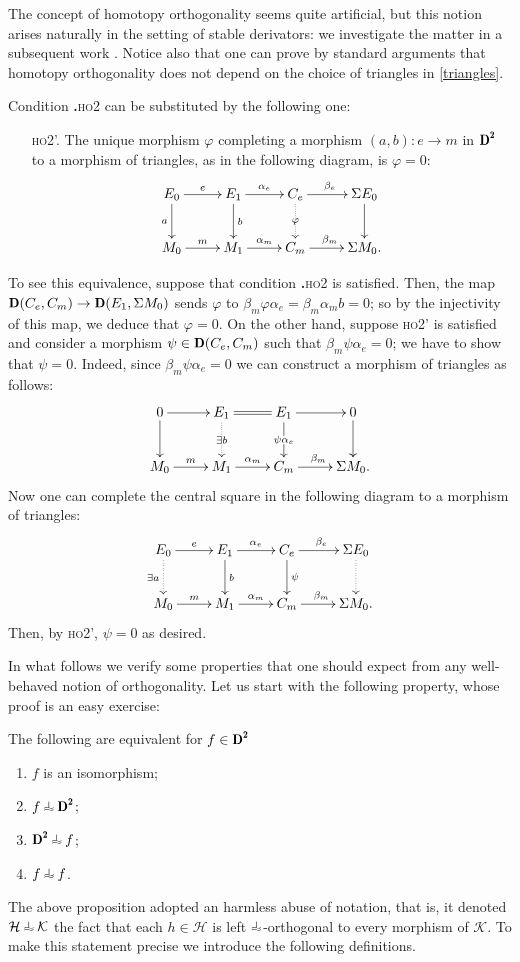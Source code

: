 The concept of homotopy orthogonality seems quite artificial, but this notion arises naturally in the setting of stable derivators: we investigate the matter in a subsequent work \cite{new_fs_on_derivator}. Notice also that one can prove by standard arguments that homotopy orthogonality does not depend on the choice of triangles in \eqref{triangles}.
\begin{remark}
Condition \textbf{.}\textsc{ho2} can be substituted by the following one:
\begin{enumerate}%
\item[\textsc{ho}2'.] The unique morphism $\varphi$ completing a morphism $(a,b)\colon e\to m$ in $\cD^\due$ to a morphism of triangles, as in the following diagram, is $\varphi=0$:
$$\xymatrix{
E_0\ar[r]^{e}\ar[d]_a&E_1\ar[r]^{\alpha_e}\ar[d]^b&C_e\ar[r]^{\beta_e}\ar@{.>}[d]|\varphi&\Sigma E_0\ar[d]\\
M_0\ar[r]^m&M_1\ar[r]^{\alpha_m}&C_m\ar[r]^{\beta_m}&\Sigma M_0.
}$$
\end{enumerate}
To see this equivalence, suppose that condition \textbf{.}\textsc{ho2} is satisfied. Then, the map $\cD(C_e,C_m)\to \cD(E_1,\Sigma M_0)$ sends $\varphi$ to $\beta_m\varphi\alpha_e=\beta_m\alpha_m b=0$; so by the injectivity of this map, we deduce that $\varphi=0$. On the other hand, suppose \textsc{ho}2' is satisfied and consider a morphism $\psi\in \cD(C_e,C_m)$ such that $\beta_m\psi\alpha_e=0$; we have to show that $\psi=0$. Indeed, since $\beta_m\psi\alpha_e=0$ we can construct a morphism of triangles as follows:
$$\xymatrix{
0\ar[r]\ar[d]&E_1\ar@{=}[r]\ar@{.>}[d]|{\exists b}&E_1\ar[r]^{}\ar[d]|{\psi\alpha_e}&0\ar[d]\\
M_0\ar[r]^m&M_1\ar[r]^{\alpha_m}&C_m\ar[r]^{\beta_m}&\Sigma M_0.
}$$
Now one can complete the central square in the following diagram to a morphism of triangles:
$$\xymatrix{
E_0\ar[r]^{e}\ar@{.>}[d]_{\exists a}&E_1\ar[r]^{\alpha_e}\ar[d]^b&C_e\ar[r]^{\beta_e}\ar[d]^\psi&\Sigma E_0\ar@{.>}[d]\\
M_0\ar[r]^m&M_1\ar[r]^{\alpha_m}&C_m\ar[r]^{\beta_m}&\Sigma M_0.
}$$
Then, by \textsc{ho}2', $\psi=0$ as desired.
\end{remark}
In what follows we verify some properties that one should expect from any well-behaved notion of orthogonality.
Let us start with the following property, whose proof is an easy exercise:
\begin{lemma}\label{is_an_iso_if_horth_to_all}
The following are equivalent for $f\in\cD^\due$
\begin{enumerate}[label=(\roman*)]
	\item $f$ is an isomorphism;
	\item $f\horth \cD^\due$;
	\item $\cD^\due\horth f$;
	\item $f\horth f$.
\end{enumerate}
\end{lemma}
The above proposition adopted an harmless abuse of notation, that is, it denoted $\mathcal{H}\horth \mathcal{K}$ the fact that each $h\in\mathcal{H}$ is left $\horth$-orthogonal to every morphism of $\mathcal{K}$. To make this statement precise we introduce the following definitions.

